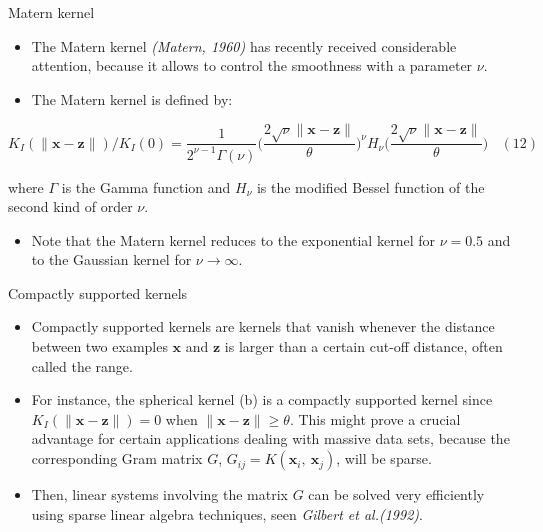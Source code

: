 \documentclass[
  ignorenonframetext,
]{beamer}
\providecommand{\tightlist}{%
  \setlength{\itemsep}{0pt}\setlength{\parskip}{0pt}}
\begin{document}
\begin{frame}{Matern kernel}
\protect\hypertarget{matern-kernel}{}
\begin{itemize}
\item
  The Matern kernel \emph{(Matern, 1960)} has recently received
  considerable attention, because it allows to control the smoothness
  with a parameter \(\nu\).
\item
  The Matern kernel is defined by:
\end{itemize}

\[
K_I(\|\pmb x - \pmb z\|)/K_I(0) = {\frac 1 {2^{\nu-1}\Gamma(\nu)}} \Big(\frac {2\sqrt \nu\|\pmb x - \pmb z\|} {\theta} \Big)^\nu H_\nu \Big(\frac {2\sqrt \nu\|\pmb x - \pmb z\|} {\theta} \Big) \ \ \ \ (12)
\]

where \(\Gamma\) is the Gamma function and \(H_\nu\) is the modified
Bessel function of the second kind of order \(\nu\).

\begin{itemize}
\tightlist
\item
  Note that the Matern kernel reduces to the exponential kernel for
  \(\nu = 0.5\) and to the Gaussian kernel for
  \(\nu \rightarrow \infty\).
\end{itemize}
\end{frame}

\begin{frame}{Compactly supported kernels}
\protect\hypertarget{compactly-supported-kernels}{}
\begin{itemize}
\item
  Compactly supported kernels are kernels that vanish whenever the
  distance between two examples \(\pmb x\) and \(\pmb z\) is larger than
  a certain cut-off distance, often called the range.
\item
  For instance, the spherical kernel (b) is a compactly supported kernel
  since \(K_I(\|\pmb x - \pmb z\|) = 0\) when
  \(\|\pmb x - \pmb z\| \geq \theta\). This might prove a crucial
  advantage for certain applications dealing with massive data sets,
  because the corresponding Gram matrix \(G\),
  \(G_{ij} = K(\pmb x_i,\ \pmb x_j)\), will be sparse.
\item
  Then, linear systems involving the matrix \(G\) can be solved very
  efficiently using sparse linear algebra techniques, seen \emph{Gilbert
  et al.(1992)}.
\end{itemize}
\end{frame}
\end{document}
